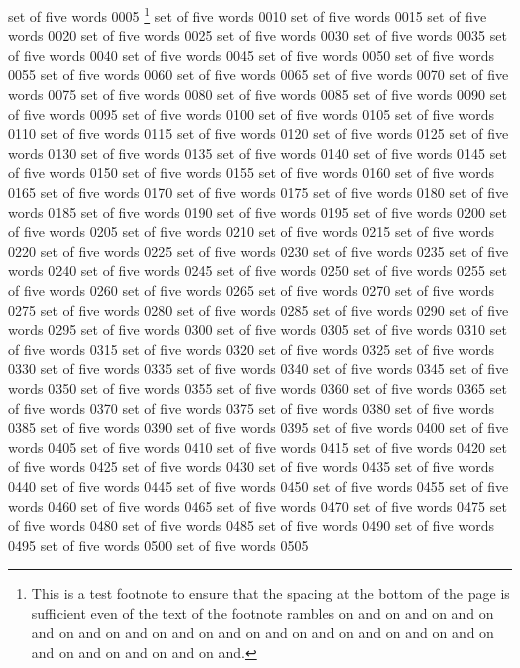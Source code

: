 \clearpage
set	of	five	words	0005
\footnote{This is a test footnote to ensure that the spacing at the
bottom of the page is sufficient even of the text of the footnote
rambles
on and on and
on and on and
on and on and
on and on and
on and on and
on and on and
on and on and
on and on and
on and on and.}
set	of	five	words	0010
set	of	five	words	0015
set	of	five	words	0020
set	of	five	words	0025
set	of	five	words	0030
set	of	five	words	0035
set	of	five	words	0040
set	of	five	words	0045
set	of	five	words	0050
set	of	five	words	0055
set	of	five	words	0060
set	of	five	words	0065
set	of	five	words	0070
set	of	five	words	0075
set	of	five	words	0080
set	of	five	words	0085
set	of	five	words	0090
set	of	five	words	0095
set	of	five	words	0100
set	of	five	words	0105
set	of	five	words	0110
set	of	five	words	0115
set	of	five	words	0120
set	of	five	words	0125
set	of	five	words	0130
set	of	five	words	0135
set	of	five	words	0140
set	of	five	words	0145
set	of	five	words	0150
set	of	five	words	0155
set	of	five	words	0160
set	of	five	words	0165
set	of	five	words	0170
set	of	five	words	0175
set	of	five	words	0180
set	of	five	words	0185
set	of	five	words	0190
set	of	five	words	0195
set	of	five	words	0200
set	of	five	words	0205
set	of	five	words	0210
set	of	five	words	0215
set	of	five	words	0220
set	of	five	words	0225
set	of	five	words	0230
set	of	five	words	0235
set	of	five	words	0240
set	of	five	words	0245
set	of	five	words	0250
set	of	five	words	0255
set	of	five	words	0260
set	of	five	words	0265
set	of	five	words	0270
set	of	five	words	0275
set	of	five	words	0280
set	of	five	words	0285
set	of	five	words	0290
set	of	five	words	0295
set	of	five	words	0300
set	of	five	words	0305
set	of	five	words	0310
set	of	five	words	0315
set	of	five	words	0320
set	of	five	words	0325
set	of	five	words	0330
set	of	five	words	0335
set	of	five	words	0340
set	of	five	words	0345
set	of	five	words	0350
set	of	five	words	0355
set	of	five	words	0360
set	of	five	words	0365
set	of	five	words	0370
set	of	five	words	0375
set	of	five	words	0380
set	of	five	words	0385
set	of	five	words	0390
set	of	five	words	0395
set	of	five	words	0400
set	of	five	words	0405
set	of	five	words	0410
set	of	five	words	0415
set	of	five	words	0420
set	of	five	words	0425
set	of	five	words	0430
set	of	five	words	0435
set	of	five	words	0440
set	of	five	words	0445
set	of	five	words	0450
set	of	five	words	0455
set	of	five	words	0460
set	of	five	words	0465
set	of	five	words	0470
set	of	five	words	0475
set	of	five	words	0480
set	of	five	words	0485
set	of	five	words	0490
set	of	five	words	0495
set	of	five	words	0500
set	of	five	words	0505
